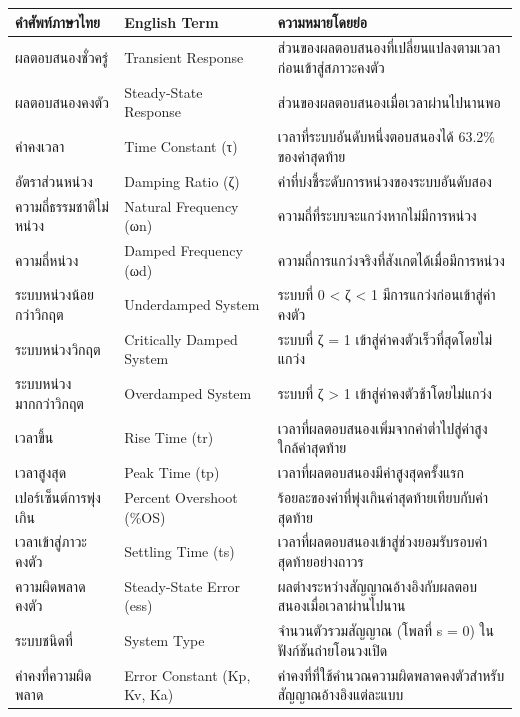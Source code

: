 \begin{table}[htbp]
    \centering
    \begin{tabularx}{\textwidth}{@{}>{\raggedright\arraybackslash}p{}>{\raggedright\arraybackslash}p{}>{\raggedright\arraybackslash}X@{}}
        \hline
        \textbf{คำศัพท์ภาษาไทย} & \textbf{English Term} & \textbf{ความหมายโดยย่อ} \\
        \hline
        ผลตอบสนองชั่วครู่ & Transient Response & ส่วนของผลตอบสนองที่เปลี่ยนแปลงตามเวลาก่อนเข้าสู่สภาวะคงตัว \\
        ผลตอบสนองคงตัว & Steady-State Response & ส่วนของผลตอบสนองเมื่อเวลาผ่านไปนานพอ \\
        ค่าคงเวลา & Time Constant (τ) & เวลาที่ระบบอันดับหนึ่งตอบสนองได้ 63.2\% ของค่าสุดท้าย \\
        อัตราส่วนหน่วง & Damping Ratio (ζ) & ค่าที่บ่งชี้ระดับการหน่วงของระบบอันดับสอง \\
        ความถี่ธรรมชาติไม่หน่วง & Natural Frequency (ωn) & ความถี่ที่ระบบจะแกว่งหากไม่มีการหน่วง \\
        ความถี่หน่วง & Damped Frequency (ωd) & ความถี่การแกว่งจริงที่สังเกตได้เมื่อมีการหน่วง \\
        ระบบหน่วงน้อยกว่าวิกฤต & Underdamped System & ระบบที่ 0 < ζ < 1 มีการแกว่งก่อนเข้าสู่ค่าคงตัว \\
        ระบบหน่วงวิกฤต & Critically Damped System & ระบบที่ ζ = 1 เข้าสู่ค่าคงตัวเร็วที่สุดโดยไม่แกว่ง \\
        ระบบหน่วงมากกว่าวิกฤต & Overdamped System & ระบบที่ ζ > 1 เข้าสู่ค่าคงตัวช้าโดยไม่แกว่ง \\
        เวลาขึ้น & Rise Time (tr) & เวลาที่ผลตอบสนองเพิ่มจากค่าต่ำไปสู่ค่าสูงใกล้ค่าสุดท้าย \\
        เวลาสูงสุด & Peak Time (tp) & เวลาที่ผลตอบสนองมีค่าสูงสุดครั้งแรก \\
        เปอร์เซ็นต์การพุ่งเกิน & Percent Overshoot (\%OS) & ร้อยละของค่าที่พุ่งเกินค่าสุดท้ายเทียบกับค่าสุดท้าย \\
        เวลาเข้าสู่ภาวะคงตัว & Settling Time (ts) & เวลาที่ผลตอบสนองเข้าสู่ช่วงยอมรับรอบค่าสุดท้ายอย่างถาวร \\
        ความผิดพลาดคงตัว & Steady-State Error (ess) & ผลต่างระหว่างสัญญาณอ้างอิงกับผลตอบสนองเมื่อเวลาผ่านไปนาน \\
        ระบบชนิดที่ & System Type & จำนวนตัวรวมสัญญาณ (โพลที่ s = 0) ในฟังก์ชันถ่ายโอนวงเปิด \\
        ค่าคงที่ความผิดพลาด & Error Constant (Kp, Kv, Ka) & ค่าคงที่ที่ใช้คำนวณความผิดพลาดคงตัวสำหรับสัญญาณอ้างอิงแต่ละแบบ \\
        \hline
    \end{tabularx}
\end{table}



